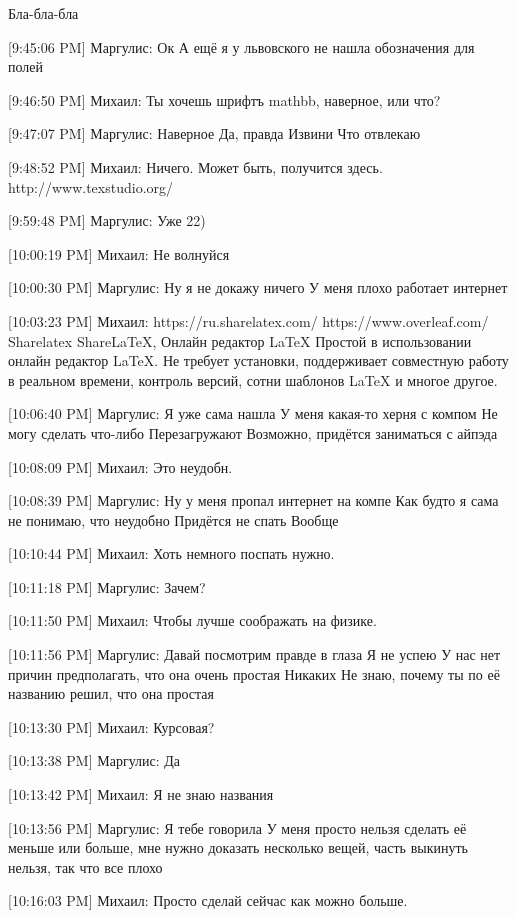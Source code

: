 \documentclass{article}
\newcommand{\yat}{{\fontencoding{X2}\selectfont\cyryat}} %
\begin{document}
$ $

Бла-бла-бла

[9:45:06 PM] Маргулис:
Ок
 А ещё я у львовского не нашла обозначения для полей

[9:46:50 PM] Михаил:
Ты хочешь шрифтъ mathbb{}, наверное, или что?

[9:47:07 PM] Маргулис:
Наверное
 Да, правда
 Извини
 Что отвлекаю

[9:48:52 PM] Михаил:
Ничего. Может быть, получится здесь. http://www.texstudio.org/

[9:59:48 PM] Маргулис:
Уже 22)

[10:00:19 PM] Михаил:
Не волнуйся

[10:00:30 PM] Маргулис:
Ну я не докажу ничего
 У меня плохо работает интернет

[10:03:23 PM] Михаил:
https://ru.sharelatex.com/
https://www.overleaf.com/
Sharelatex
ShareLaTeX, Онлайн редактор LaTeX
Простой в использовании онлайн редактор LaTeX. Не требует установки, поддерживает совместную работу в реальном времени, контроль версий, сотни шаблонов LaTeX и многое другое.

[10:06:40 PM] Маргулис:
Я уже сама нашла
 У меня какая-то херня с компом
 Не могу сделать что-либо
 Перезагружают
 Возможно, придётся заниматься с айпэда

[10:08:09 PM] Михаил:
Это неудобн.

[10:08:39 PM] Маргулис:
Ну у меня пропал интернет на компе
 Как будто я сама не понимаю, что неудобно
 Придётся не спать
 Вообще

[10:10:44 PM] Михаил:
Хоть немного поспать нужно.

[10:11:18 PM] Маргулис:
Зачем?

[10:11:50 PM] Михаил:
Чтобы лучше соображать на физике.

[10:11:56 PM] Маргулис:
Давай посмотрим правде в глаза
 Я не успею
 У нас нет причин предполагать, что она очень простая
 Никаких
 Не знаю, почему ты по её названию решил, что она простая

[10:13:30 PM] Михаил:
Курсовая?

[10:13:38 PM] Маргулис:
Да

[10:13:42 PM] Михаил:
Я не знаю названия

[10:13:56 PM] Маргулис:
Я тебе говорила
 У меня просто нельзя сделать её меньше или больше, мне нужно доказать несколько вещей, часть выкинуть нельзя, так что все плохо

[10:16:03 PM] Михаил:
Просто сделай сейчас как можно больше.
\end{document}
